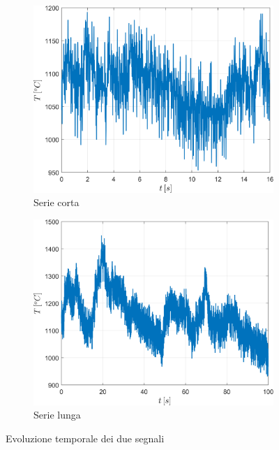 \begin{figure}[H]
	\centering
	\begin{subfigure}{0.5\textwidth}
		\centering
		\includegraphics[width=0.95\linewidth]{"../sperimentazione nei propulsori/time_short"}
		\caption{Serie corta}
		\label{fig:timeshort}
	\end{subfigure}%
\begin{subfigure}{0.5\textwidth}
	\centering
	\includegraphics[width=0.95\linewidth]{"../sperimentazione nei propulsori/time_long"}
	\caption{Serie lunga}
	\label{fig:timelong}
\end{subfigure}
\caption{Evoluzione temporale dei due segnali}
\label{fig:timeboth}
\end{figure}

